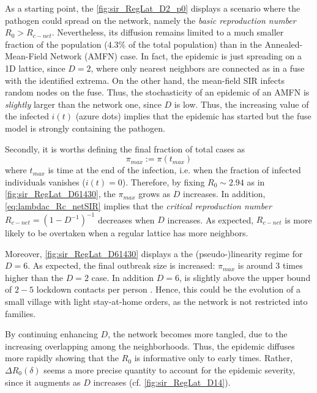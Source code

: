 \documentclass[a4paper,10pt,twoside]{book} %
\theoremstyle{definition}
\begin{document}
As a starting point, the \autoref{fig:sir_RegLat_D2_p0} displays a scenario where the pathogen could spread on the network, namely the \textit{basic reproduction number} $R_0 > R_{c-net}$. Nevertheless, its diffusion remains limited to a much smaller fraction of the population ($4.3 \%$ of the total population) than in the Annealed-Mean-Field Network (AMFN) case. In fact, the epidemic is just spreading on a 1D lattice, since $ D = 2$, where only nearest neighbors are connected as in a fuse with the identified extrema. On the other hand, the mean-field SIR infects random nodes on the fuse. Thus, the stochasticity of an epidemic of an AMFN is \textit{slightly}  larger than the network one, since $ D$ is low. Thus, the increasing value of the infected $i(t)$ (azure dots) implies that the epidemic has started but the fuse model is strongly containing the pathogen. 

Secondly, it is worths defining the final fraction of total cases as
\begin{equation}
	\pi_{max} := \pi(t_{max})
	\label{eq:def_pmax}
\end{equation}
where $ t_{max}$ is time at the end of the infection, i.e. when the fraction of infected individuals vanishes ($i(t) = 0$).
Therefore, by fixing $R_0 \sim 2.94$ as in \autoref{fig:sir_RegLat_D61430}, the $ \pi_{max}$ grows as $D$ increases. In addition, \autoref{eq:lambdac_Rc_netSIR} implies that the
\textit{critical reproduction number} $R_{c-net} = (1-D^{-1})^{-1}$ decreases when $D$ increases. As expected, $R_{c-net}$ is more likely to be overtaken when a regular lattice has more neighbors.

Moreover, \autoref{fig:sir_RegLat_D61430} displays a the (pseudo-)linearity regime for $ D = 6$. As expected, the final outbreak size is increased: $ \pi_{max}$ is around $ 3$ times higher than the $ D=2$ case. In addition $D = 6$, is slightly above the upper bound of $2-5$ lockdown contacts per person \cite{Liu::2021_Review_SContactPattern}. Hence, this could be the evolution of a small village with light stay-at-home orders, as the network is not restricted into families.


By continuing enhancing $ D$, the network becomes more tangled, due to the increasing overlapping among  the neighborhoods. Thus, the epidemic diffuses more rapidly showing that the $ R_0$ is informative only to early times. Rather, $\Delta R_0(\delta)$ seems a more precise quantity to account for the epidemic severity, since it augments as $D$ increases (cf. \autoref{fig:sir_RegLat_D14}).
\end{document}
